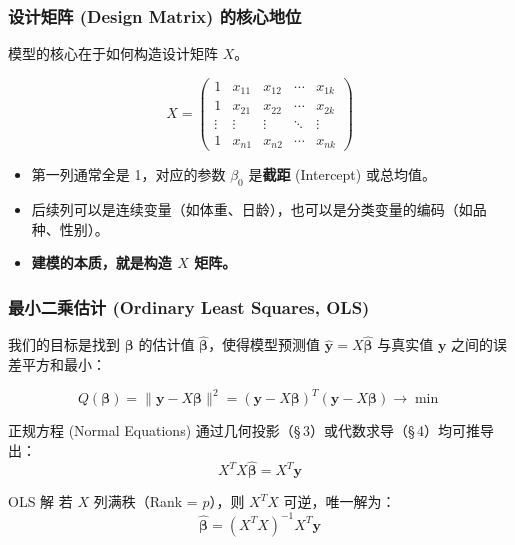 
\begin{frame}
\frametitle{设计矩阵 (Design Matrix) 的核心地位}

模型的核心在于如何构造设计矩阵 $X$。

\[
X = \begin{pmatrix}
1 & x_{11} & x_{12} & \cdots & x_{1k} \\
1 & x_{21} & x_{22} & \cdots & x_{2k} \\
\vdots & \vdots & \vdots & \ddots & \vdots \\
1 & x_{n1} & x_{n2} & \cdots & x_{nk}
\end{pmatrix}
\]

\begin{itemize}
    \item 第一列通常全是 1，对应的参数 $\beta_0$ 是\textbf{截距} (Intercept) 或总均值。
    \item 后续列可以是连续变量（如体重、日龄），也可以是分类变量的编码（如品种、性别）。
    \item \textbf{建模的本质，就是构造 $X$ 矩阵。}
\end{itemize}

\end{frame}


\begin{frame}
\frametitle{最小二乘估计 (Ordinary Least Squares, OLS)}

我们的目标是找到 $\boldsymbol{\beta}$ 的估计值 $\hat{\boldsymbol{\beta}}$，使得模型预测值 $\hat{\mathbf{y}} = X \hat{\boldsymbol{\beta}}$ 与真实值 $\mathbf{y}$ 之间的误差平方和最小：

\[
Q(\boldsymbol{\beta}) = \|\mathbf{y} - X \boldsymbol{\beta}\|^2 = (\mathbf{y} - X \boldsymbol{\beta})^T (\mathbf{y} - X \boldsymbol{\beta}) \to \min
\]

\pause

\begin{block}{正规方程 (Normal Equations)}
通过几何投影（\S\,3）或代数求导（\S\,4）均可推导出：
\[
X^T X \hat{\boldsymbol{\beta}} = X^T \mathbf{y}
\]
\end{block}

\begin{block}{OLS 解}
若 $X$ 列满秩（Rank = $p$），则 $X^T X$ 可逆，唯一解为：
\[
\hat{\boldsymbol{\beta}} = (X^T X)^{-1} X^T \mathbf{y}
\]
\end{block}

\end{frame}

